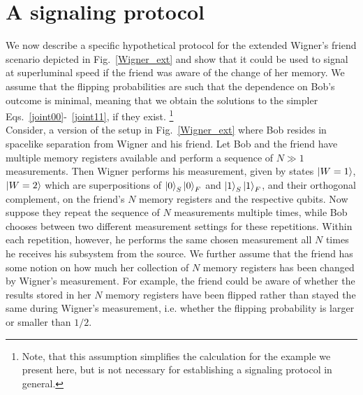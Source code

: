 \documentclass[a4paper,twocolumn,11pt,accepted=2017-05-09,dvipsnames]{quantumarticle}
\numberwithin{equation}{section}
\begin{document}
\section{A signaling protocol}
\label{ConfSig}

We now describe a specific hypothetical protocol for the extended Wigner's friend scenario depicted in Fig.~\ref{Wigner_ext} and show that it could be used to signal at superluminal speed if the friend was aware of the change of her memory. We assume that the flipping probabilities are such that the dependence on Bob's outcome is minimal, meaning that we obtain the solutions to the simpler Eqs.~\eqref{joint00}-~\eqref{joint11}, if they exist. \footnote{Note, that this assumption simplifies the calculation for the example we present here, but is not necessary for establishing a signaling protocol in general.} \\

Consider, a version of the setup in Fig.~\ref{Wigner_ext} where Bob resides in spacelike separation from Wigner and his friend. Let Bob and the friend have multiple memory registers available and perform a sequence of $N\gg1$ measurements. Then Wigner performs his measurement, given by states $\ket{W=1}$, $\ket{W=2}$ which are superpositions of $\ket{0}_S\ket{0}_F$ and $\ket{1}_S\ket{1}_F$, and their orthogonal complement, on the friend's $N$ memory registers and the respective qubits. Now suppose they repeat the sequence of  $N$ measurements multiple times, while Bob chooses between two different measurement settings for these repetitions. Within each repetition, however, he performs the same chosen measurement all $N$ times he receives his subsystem from the source. We further assume that the friend has some notion on how much her collection of $N$ memory registers has been changed by Wigner's measurement. For example, the friend could be aware of whether the results stored in her $N$ memory registers have been flipped rather than stayed the same during Wigner's measurement, i.e. whether the flipping probability is larger or smaller than $1/2$. \\
\end{document}
